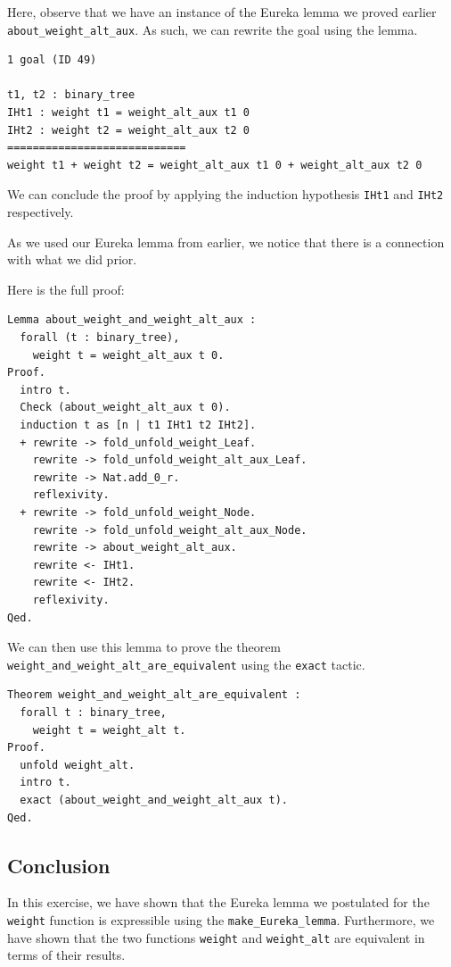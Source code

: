 \documentclass{article}
\begin{document}
Here, observe that we have an instance of the Eureka lemma we proved earlier \texttt{about\_weight\_alt\_aux}. As such, we can rewrite the goal using the lemma.

\begin{lstlisting}
1 goal (ID 49)

t1, t2 : binary_tree
IHt1 : weight t1 = weight_alt_aux t1 0
IHt2 : weight t2 = weight_alt_aux t2 0
============================
weight t1 + weight t2 = weight_alt_aux t1 0 + weight_alt_aux t2 0
\end{lstlisting}

We can conclude the proof by applying the induction hypothesis \texttt{IHt1} and \texttt{IHt2} respectively.

As we used our Eureka lemma from earlier, we notice that there is a connection with what we did prior.

Here is the full proof:

\begin{lstlisting}
Lemma about_weight_and_weight_alt_aux : 
  forall (t : binary_tree),
    weight t = weight_alt_aux t 0.
Proof.  
  intro t.
  Check (about_weight_alt_aux t 0).
  induction t as [n | t1 IHt1 t2 IHt2].
  + rewrite -> fold_unfold_weight_Leaf.
    rewrite -> fold_unfold_weight_alt_aux_Leaf.
    rewrite -> Nat.add_0_r.
    reflexivity.
  + rewrite -> fold_unfold_weight_Node.
    rewrite -> fold_unfold_weight_alt_aux_Node.
    rewrite -> about_weight_alt_aux.
    rewrite <- IHt1.
    rewrite <- IHt2.
    reflexivity.
Qed.
\end{lstlisting}

We can then use this lemma to prove the theorem \texttt{weight\_and\_weight\_alt\_are\_equivalent} using the \texttt{exact} tactic.

\begin{lstlisting}
Theorem weight_and_weight_alt_are_equivalent :
  forall t : binary_tree,
    weight t = weight_alt t.
Proof.
  unfold weight_alt.
  intro t.
  exact (about_weight_and_weight_alt_aux t).
Qed.
\end{lstlisting}

\subsection{Conclusion}

In this exercise, we have shown that the Eureka lemma we postulated for the \texttt{weight} function is expressible using the \texttt{make\_Eureka\_lemma}. Furthermore, we have shown that the two functions \texttt{weight} and \texttt{weight\_alt} are equivalent in terms of their results.
\end{document}
